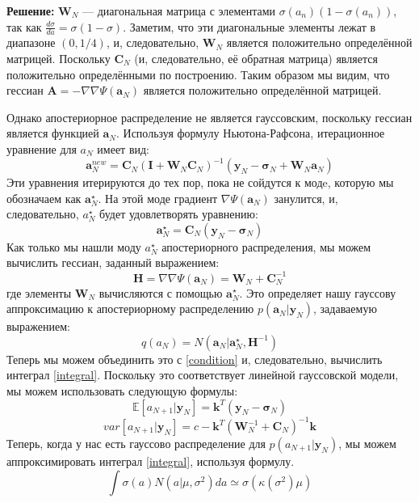\textbf{Решение:}
$\mathbf{W}_{N}$ — диагональная матрица с элементами $\sigma(a_n)(1-\sigma(a_n))$, так как $\frac{d\sigma}{da}=\sigma(1-\sigma)$. Заметим, что эти диагональные элементы лежат в диапазоне $(0, 1/4)$, и, следовательно, $\mathbf{W}_{N}$ является положительно определённой матрицей. Поскольку $\mathbf{C}_N$ (и, следовательно, её обратная матрица) является положительно определёнными по построению. Таким образом мы видим, что гессиан $\mathbf{A}=-\nabla \nabla \Psi(\mathbf{a}_N)$ является положительно определённой матрицей.


Однако апостериорное распределение не является гауссовским, поскольку гессиан является функцией $\mathbf{a}_N$.
Используя формулу Ньютона-Рафсона, итерационное уравнение для $a_N$ имеет вид:
\[
\mathbf{a}_N^{new} = \mathbf{C}_N(\mathbf{I} + \mathbf{W}_N\mathbf{C}_N)^{-1}(\mathbf{y}_N-\mathbf{\sigma}_N+\mathbf{W}_N\mathbf{a}_N) 
\]
Эти уравнения итерируются до тех пор, пока не сойдутся к модe, которую мы обозначаем как $\mathbf{a}_N^{\star}$. На этой моде градиент $\nabla \Psi(\mathbf{a}_N)$ занулится, и, следовательно, $a_N^{\star}$ будет удовлетворять уравнению:
\begin{equation}
\label{star}
\mathbf{a}_N^{\star} = \mathbf{C}_N(\mathbf{y}_N - \mathbf{\sigma}_N) 
\end{equation}
Как только мы нашли моду $a_N^{\star}$ апостериорного распределения, мы можем вычислить гессиан, заданный выражением:
\[
\mathbf{H} = \nabla \nabla \Psi(\mathbf{a}_N) = \mathbf{W}_N+\mathbf{C}_N^{-1} 
\]
где элементы $\mathbf{W}_N$ вычисляются с помощью $\mathbf{a}_N^{\star}$. Это определяет нашу гауссову аппроксимацию к апостериорному распределению $p(\mathbf{a}_N|\mathbf{y}_N)$, задаваемую выражением:
\[
q(a_N) = N(\mathbf{a}_N|\mathbf{a}_N^{\star}, \mathbf{H}^{-1}) 
\]
Теперь мы можем объединить это с \ref{condition} и, следовательно, вычислить интеграл \ref{integral}. Поскольку это соответствует линейной гауссовской модели, мы можем использовать следующую формулы:
\[
\mathbb{E}[a_{N+1}|\mathbf{y}_N] =\mathbf{k}^T(\mathbf{y}_N - \mathbf{\sigma}_N) 
\]
\[
var[a_{N+1}|\mathbf{y}_N] = c-\mathbf{k}^T(\mathbf{W}_N^{-1} + \mathbf{C}_N)^{-1}\mathbf{k} 
\]
Теперь, когда у нас есть гауссово распределение для $p(a_{N+1}|\mathbf{y}_{N})$, мы можем аппроксимировать интеграл \ref{integral}, используя формулу.
\[
\int \sigma(a)N(a|\mu,\sigma^{2})da\simeq \sigma(\kappa(\sigma^{2})\mu)
\]

